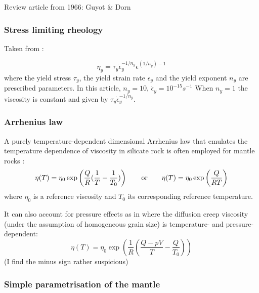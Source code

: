 \Literature \cite{basv06,buro11,faff11,gagd14,gery10,goev79,kaka08,kako09,kary01,mesk10,zhwa13,chsm18,shwl17}
Review article from 1966: Guyot \& Dorn \cite{gudo67}


\subsubsection{Stress limiting rheology}

Taken from \cite{vavv02}:

\[
\eta_y = \tau_y \dot{\epsilon}_y^{-1/n_y} \dot{\epsilon}^{(1/n_y) -1 } 
\]
where the yield stress $\tau_y$, the yield strain rate $\epsilon_y$ and the yield exponent $n_y$ are
prescribed parameters. In this article, $n_y=10$, $\dot{\epsilon}_y=10^{-15}s^{-1}$
When $n_y=1$ the viscosity is constant and given by $\tau_y \dot{\epsilon}_y^{-1/n_y}$.



\subsubsection{Arrhenius law}

A purely temperature-dependent dimensional Arrhenius law that emulates the temperature
dependence of viscosity in silicate rock is often employed for mantle rocks 
\cite{albe00,zhzm09,vata11,bogs13b,namu13,stha13,boba19,gult19}:
\begin{equation}
\eta(T)=\eta_0 \exp \left( \frac{Q}{R}(\frac{1}{T}-\frac{1}{T_0}) \right)
\qquad 
{\rm or}
\qquad 
\eta(T)=\eta_0 \exp \left( \frac{Q}{RT} \right)
\end{equation}
where $\eta_0$ is a reference viscosity and $T_0$ its corresponding reference 
temperature.

It can also account for pressure effects as in \cite{lorg18} where the
diffusion creep viscosity (under the assumption of homogeneous grain size)
is temperature- and pressure-dependent:
\[
\eta(T)=\eta_0 \exp \left( \frac{1}{R}(\frac{Q-pV}{T}-\frac{Q}{T_0}) \right)
\]
(I find the minus sign rather suspicious)



\subsubsection{Simple parametrisation of the mantle}

